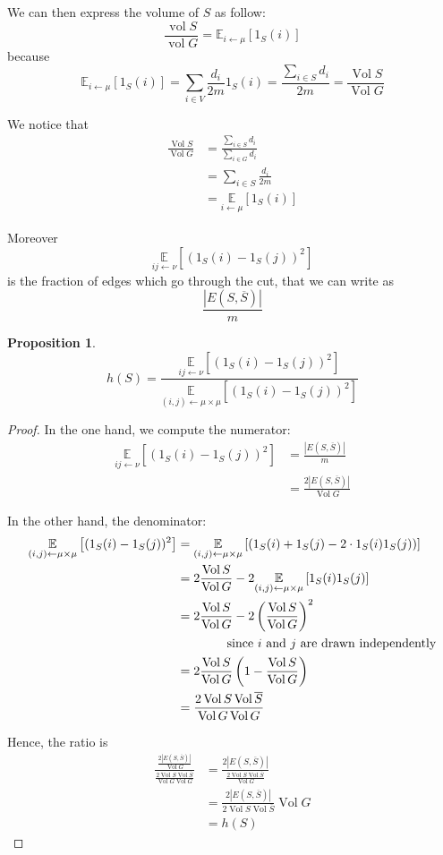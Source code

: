 \documentclass[12pt]{article}
\newtheorem{proposition}[lemma]{Proposition}
\newcommand{\EE}{\mathbb{E}}
\newcommand{\la}{\leftarrow}
\newcommand{\opname}[1]{\operatorname{#1}}
\newcommand{\card}[1]{\left\lvert#1\right\rvert}
\newcommand{\esp}[2][]{\underset{#1}{\EE}\left[ #2 \right]}
\DeclareMathOperator{\vol}{Vol}
\begin{document}
We can then express the volume of $S$ as follow:
\[
    \frac{\opname{vol} S}{\opname{vol} G} = \EE_{i \leftarrow \mu} \left[  1_S(i)\right]
\]
because
\[
    \EE_{i \leftarrow \mu} \left[  1_S(i)\right] = \sum_{i\in V} \frac {d_i} {2m} 1_S(i) = \frac { \sum_{i\in S} d_i} {2m} = \frac {\vol S} {\vol G}
\]

We notice that
\[
    \begin{aligned}
        \frac{\vol S}{\vol G} &= \frac{\sum\limits_{i\in S} d_i}{\sum\limits_{i\in G} d_i}\\
        &= \sum\limits_{i\in S}\frac{d_i}{2m}\\
        &= \esp[i\la\mu]{1_S(i)}
    \end{aligned}
\]

Moreover
\[
    \esp[ij\la\nu]{(1_S(i)-1_S(j))^2}
\]
is the fraction of edges which go through the cut, that we can write as
\[
    \frac{\card{E(S,\overline{S})}}{m}
\]


\begin{proposition}
    \[
        h(S) = \frac{\esp[ij\la \nu]{(1_S(i)-1_S(j))^2}}{\esp[(i,j)\la\mu\times\mu]{(1_S(i)-1_S(j))^2}}
    \]
\end{proposition}
\begin{proof}
    In the one hand, we compute the numerator:
    \[
        \begin{aligned}
            \esp[ij\la\nu]{(1_S(i)-1_S(j))^2} &= \frac{\card{E(S,\overline{S})}}{m}\\
            &= \frac{2\card{E(S,\overline{S})}}{\vol G}
        \end{aligned}
    \]
    
    In the other hand, the denominator:
    \[
        \begin{aligned}
            \esp[(i,j)\la\mu\times\mu]{(1_S(i)-1_S(j))^2} &= \esp[(i,j)\la\mu\times\mu]{(1_S(i)+1_S(j)-2\cdot 1_S(i)1_S(j))}\\
            &= 2 \frac{\vol S}{\vol G} -2\esp[(i,j)\la\mu\times\mu]{1_S(i)1_S(j)}\\
            &=2\frac{\vol S}{\vol G} - 2 \left( \frac{\vol S}{\vol G}\right)^2\\
            &\text{\qquad\qquad since }i\text{ and }j\text{ are drawn independently}\\
            &= 2 \frac{\vol S}{\vol G}\left( 1- \frac{\vol S}{\vol G}\right)\\
            &= \frac{2 \vol S \vol \overline{S}}{\vol G \vol G}
        \end{aligned}
    \]
    
    Hence, the ratio is
    \[
        \begin{aligned}
            \frac{\frac{2\card{E(S,\overline{S})}}{\vol G}}{\frac{2 \vol S \vol \overline{S}}{\vol G \vol G}} &= \frac{2\card{E(S,\overline{S})}}{\frac{2 \vol S \vol \overline{S}}{\vol G}}\\
            &= \frac{2\card{E(S,\overline{S})}}{2 \vol S \vol \overline{S}}\vol G\\
            &= h(S)
        \end{aligned}
    \]
\end{proof}
\end{document}
